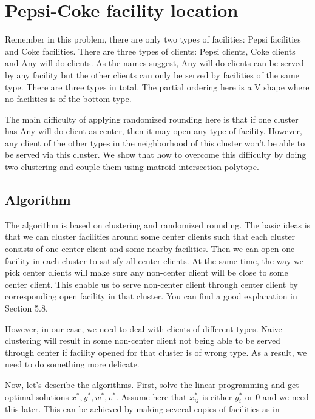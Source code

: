 \section{Pepsi-Coke facility location}

Remember in this problem, there are only two types of facilities: Pepsi facilities and Coke facilities. There are three types of clients: Pepsi clients, Coke clients and Any-will-do clients. As the names suggest, Any-will-do clients can be served by any facility but the other clients can only be served by facilities of the same type. There are three types in total. The partial ordering here is a V shape where no facilities is of the bottom type.

The main difficulty of applying randomized rounding here is that if one cluster has Any-will-do client as center, then it may open any type of facility. However, any client of the other types in the neighborhood of this cluster won't be able to be served via this cluster. We show that how to overcome this difficulty by doing two clustering and couple them using matroid intersection polytope.

\subsection{Algorithm}

The algorithm is based on clustering and randomized rounding.
The basic ideas is that we can cluster facilities around some center clients
such that each cluster consists of one center client and some nearby facilities.
Then we can open one facility in each cluster to satisfy all center clients.
At the same time, the way we pick center clients will make sure any non-center client will be close to some center client.
This enable us to serve non-center client through center client by corresponding open facility in that cluster.
You can find a good explanation in \cite{williamson2011design} Section 5.8.

However, in our case, we need to deal with clients of different types.
Naive clustering will result in some non-center client not being able to be served through center
if facility opened for that cluster is of wrong type.
As a result, we need to do something more delicate.

Now, let's describe the algorithms.
First, solve the linear programming and get optimal solutions $x^*, y^*, w^*, v^*$.
Assume here that $x^*_{ij}$ is either $y^*_i$ or $0$ and we need this later.
This can be achieved by making several copies of facilities as in \cite{chudak2003improved}

